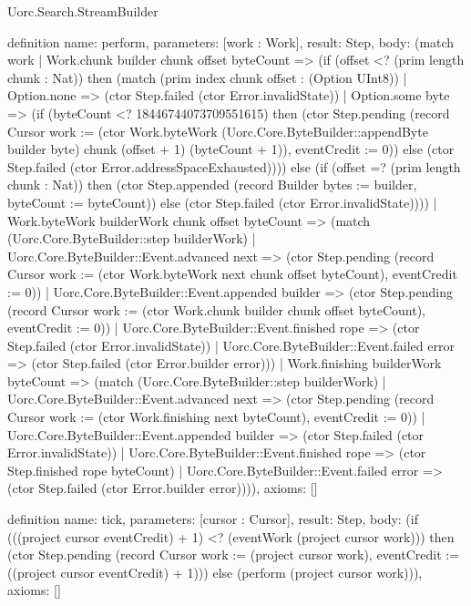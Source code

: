 \begin{lexlean}{Uorc.Search.StreamBuilder}
\begin{semanticmodule}
definition{
  name: perform,
  parameters: [work : Work],
  result: Step,
  body: (match work
    | Work.chunk builder chunk offset byteCount => (if (offset <? (prim length chunk : Nat)) then (match (prim index chunk offset : (Option UInt8))
      | Option.none => (ctor Step.failed (ctor Error.invalidState))
      | Option.some byte => (if (byteCount <? 18446744073709551615) then (ctor Step.pending (record Cursor {work := (ctor Work.byteWork (Uorc.Core.ByteBuilder::appendByte builder byte) chunk (offset + 1) (byteCount + 1)), eventCredit := 0})) else (ctor Step.failed (ctor Error.addressSpaceExhausted)))) else (if (offset =? (prim length chunk : Nat)) then (ctor Step.appended (record Builder {bytes := builder, byteCount := byteCount})) else (ctor Step.failed (ctor Error.invalidState))))
    | Work.byteWork builderWork chunk offset byteCount => (match (Uorc.Core.ByteBuilder::step builderWork)
      | Uorc.Core.ByteBuilder::Event.advanced next => (ctor Step.pending (record Cursor {work := (ctor Work.byteWork next chunk offset byteCount), eventCredit := 0}))
      | Uorc.Core.ByteBuilder::Event.appended builder => (ctor Step.pending (record Cursor {work := (ctor Work.chunk builder chunk offset byteCount), eventCredit := 0}))
      | Uorc.Core.ByteBuilder::Event.finished rope => (ctor Step.failed (ctor Error.invalidState))
      | Uorc.Core.ByteBuilder::Event.failed error => (ctor Step.failed (ctor Error.builder error)))
    | Work.finishing builderWork byteCount => (match (Uorc.Core.ByteBuilder::step builderWork)
      | Uorc.Core.ByteBuilder::Event.advanced next => (ctor Step.pending (record Cursor {work := (ctor Work.finishing next byteCount), eventCredit := 0}))
      | Uorc.Core.ByteBuilder::Event.appended builder => (ctor Step.failed (ctor Error.invalidState))
      | Uorc.Core.ByteBuilder::Event.finished rope => (ctor Step.finished rope byteCount)
      | Uorc.Core.ByteBuilder::Event.failed error => (ctor Step.failed (ctor Error.builder error)))),
  axioms: []
}

definition{
  name: tick,
  parameters: [cursor : Cursor],
  result: Step,
  body: (if (((project cursor eventCredit) + 1) <? (eventWork (project cursor work))) then (ctor Step.pending (record Cursor {work := (project cursor work), eventCredit := ((project cursor eventCredit) + 1)})) else (perform (project cursor work))),
  axioms: []
}
\end{semanticmodule}
\end{lexlean}
